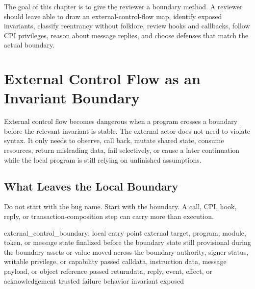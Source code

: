 The goal of this chapter is to give the reviewer a boundary method. A reviewer should leave able to draw an external-control-flow map, identify exposed invariants, classify reentrancy without folklore, review hooks and callbacks, follow CPI privileges, reason about message replies, and choose defenses that match the actual boundary.

\section{External Control Flow as an Invariant Boundary}

External control flow becomes dangerous when a program crosses a boundary before the relevant invariant is stable. The external actor does not need to violate syntax. It only needs to observe, call back, mutate shared state, consume resources, return misleading data, fail selectively, or cause a later continuation while the local program is still relying on unfinished assumptions.

\subsection{What Leaves the Local Boundary}

Do not start with the bug name. Start with the boundary. A call, CPI, hook, reply, or transaction-composition step can carry more than execution.

\begin{codeblock}
external_control_boundary:
    local entry point
    external target, program, module, token, or message
    state finalized before the boundary
    state still provisional during the boundary
    assets or value moved across the boundary
    authority, signer status, writable privilege, or capability passed
    calldata, instruction data, message payload, or object reference passed
    returndata, reply, event, effect, or acknowledgement trusted
    failure behavior
    invariant exposed
\end{codeblock}

